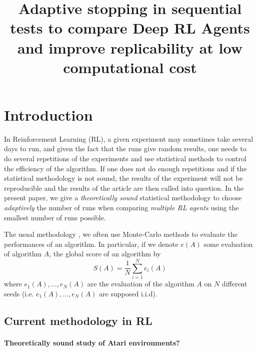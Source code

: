 \documentclass{article}
\title{Adaptive stopping in sequential tests to compare Deep RL Agents and improve replicability at low computational cost}
\date{}
\theoremstyle{plain}
\theoremstyle{remark}
\newcommand{\1}{\mathbbm{1}}
\newcommand{\todoT}[1]{\todo[inline,color=blue!40]{{\textbf{T:}~}#1}}
\numberwithin{equation}{section}
\begin{document}
\maketitle
\section{Introduction}
 In Reinforcement Learning (RL), a given experiment may sometimes take several days to run, and given the fact that the runs give random results, one needs to do several repetitions of the experiments and use statistical methods to control the efficiency of the algorithm. If one does not do enough repetitions and if the statistical methodology is not sound, the results of the experiment will not be reproducible and the results of the article are then called into question. In the present paper, we give a \textit{theoretically sound} statistical methodology to choose \textit{adaptively} the number of runs when comparing \textit{multiple RL agents} using the smallest number of runs possible.

\todoT{Continue introduction}

The usual methodology , we often use Monte-Carlo methods to evaluate the performances of an algorithm. In particular, if we denote $e(A)$ some evaluation of algorithm $A$, the global score of an algorithm by
$$S(A)=\frac{1}{N}\sum_{i=1}^N e_i(A) $$
where $e_1(A), \dots,e_N(A)$ are the evaluation of the algorithm $A$ on $N$ different seeds (i.e. $e_1(A),\dots,e_N(A)$ are supposed i.i.d).

\subsection{Current methodology in RL}
\paragraph{Theoretically sound study of Atari environments?}
\end{document}
